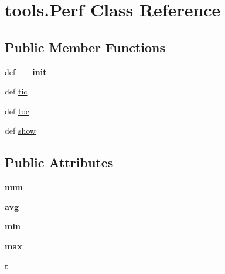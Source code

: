 \hypertarget{classtools_1_1_perf}{\section{tools.\-Perf \-Class \-Reference}
\label{classtools_1_1_perf}
}
\subsection*{\-Public \-Member \-Functions}
\begin{DoxyCompactItemize}
\item 
\hypertarget{classtools_1_1_perf_a2a9656142836ccd440cd478b8c556f36}{def {\bfseries \-\_\-\-\_\-init\-\_\-\-\_\-}}\label{classtools_1_1_perf_a2a9656142836ccd440cd478b8c556f36}

\item 
def \hyperlink{classtools_1_1_perf_a89caef783edbd23d7cf8d1856f56b615}{tic}
\item 
def \hyperlink{classtools_1_1_perf_aad55535c6c6e0fa197ad789aab0588dc}{toc}
\item 
def \hyperlink{classtools_1_1_perf_a8a3420997340d5ddfee55b5db1c11a07}{show}
\end{DoxyCompactItemize}
\subsection*{\-Public \-Attributes}
\begin{DoxyCompactItemize}
\item 
\hypertarget{classtools_1_1_perf_ab807cd43fffe3ba57431f338b1b507b3}{{\bfseries num}}\label{classtools_1_1_perf_ab807cd43fffe3ba57431f338b1b507b3}

\item 
\hypertarget{classtools_1_1_perf_a93aee8a86289a6fce942b2fcb3297cde}{{\bfseries avg}}\label{classtools_1_1_perf_a93aee8a86289a6fce942b2fcb3297cde}

\item 
\hypertarget{classtools_1_1_perf_ae08d1949f5e4f74dab5792b61e40f922}{{\bfseries min}}\label{classtools_1_1_perf_ae08d1949f5e4f74dab5792b61e40f922}

\item 
\hypertarget{classtools_1_1_perf_ae5a7677a5d3930bb576fb8a76d978725}{{\bfseries max}}\label{classtools_1_1_perf_ae5a7677a5d3930bb576fb8a76d978725}

\item 
\hypertarget{classtools_1_1_perf_a08f6383b13c04a93a5ad0cdc196efecd}{{\bfseries t}}\label{classtools_1_1_perf_a08f6383b13c04a93a5ad0cdc196efecd}

\end{DoxyCompactItemize}


